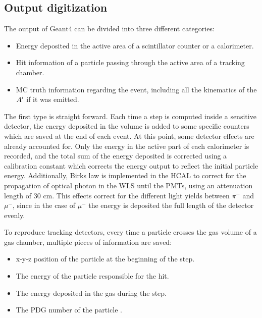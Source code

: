 \subsection{Output digitization}
\label{ch3:sec:geant4-digitization}

The output of Geant4 can be divided into three different categories:

\begin{itemize}
\item Energy deposited in the active area of a scintillator counter or a calorimeter.
\item Hit information of a particle passing through the active area of a tracking chamber.
\item MC truth information regarding the event, including all the kinematics of the $A'$ if it was emitted.
\end{itemize}

The first type is straight forward. Each time a step is computed inside a sensitive detector, the energy deposited in the volume is added to some specific counters which are saved at the end of each event. At this point, some detector effects are already accounted for. Only the energy in the active part of each calorimeter is recorded, and the total sum of the energy deposited is corrected using a calibration constant which corrects the energy output to reflect the initial particle energy. Additionally, Birks law \cite{NYIBULE2014141} is implemented in the HCAL to correct for the propagation of optical photon in the WLS until the PMTs, using an attenuation length of 30 \si{\centi\meter}. This effects correct for the different light yields between $\pi^-$ and $\mu^-$, since in the case of $\mu^-$ the energy is deposited the full length of the detector evenly.

To reproduce tracking detectors, every time a particle crosses the gas volume of a gas chamber, multiple pieces of information are saved:

\begin{itemize}
\item x-y-z position of the particle at the beginning of the step.
\item The energy of the particle responsible for the hit.  
\item The energy deposited in the gas during the step.
\item The PDG number of the particle \cite{particle-numbering-scheme}.
\end{itemize}

